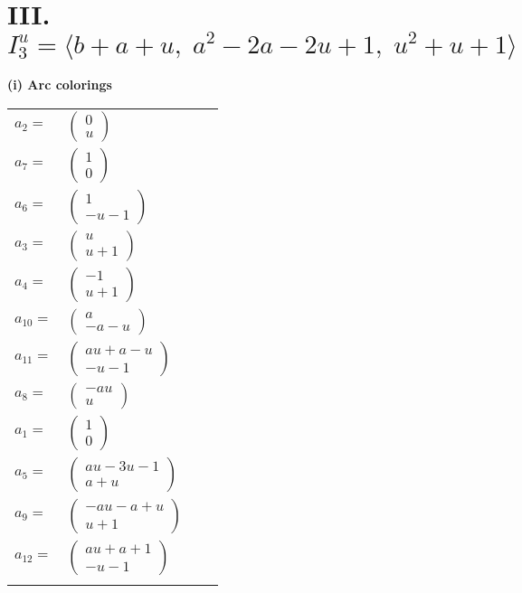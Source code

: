 \documentclass[1p]{elsarticle_modified}
\theoremstyle{definition}
\begin{document}
\centering \section*{III. $I^u_{3}= \langle b+a+u,\;a^2-2 a-2 u+1,\;u^2+u+1 \rangle$}
\flushleft \textbf{(i) Arc colorings}\\
\begin{tabular}{m{7pt} m{180pt} m{7pt} m{180pt} }
\flushright $a_{2}=$&$\begin{pmatrix}0\\u\end{pmatrix}$ \\
\flushright $a_{7}=$&$\begin{pmatrix}1\\0\end{pmatrix}$ \\
\flushright $a_{6}=$&$\begin{pmatrix}1\\- u-1\end{pmatrix}$ \\
\flushright $a_{3}=$&$\begin{pmatrix}u\\u+1\end{pmatrix}$ \\
\flushright $a_{4}=$&$\begin{pmatrix}-1\\u+1\end{pmatrix}$ \\
\flushright $a_{10}=$&$\begin{pmatrix}a\\- a- u\end{pmatrix}$ \\
\flushright $a_{11}=$&$\begin{pmatrix}a u+a- u\\- u-1\end{pmatrix}$ \\
\flushright $a_{8}=$&$\begin{pmatrix}- a u\\u\end{pmatrix}$ \\
\flushright $a_{1}=$&$\begin{pmatrix}1\\0\end{pmatrix}$ \\
\flushright $a_{5}=$&$\begin{pmatrix}a u-3 u-1\\a+u\end{pmatrix}$ \\
\flushright $a_{9}=$&$\begin{pmatrix}- a u- a+u\\u+1\end{pmatrix}$ \\
\flushright $a_{12}=$&$\begin{pmatrix}a u+a+1\\- u-1\end{pmatrix}$\\&\end{tabular}
\end{document}
